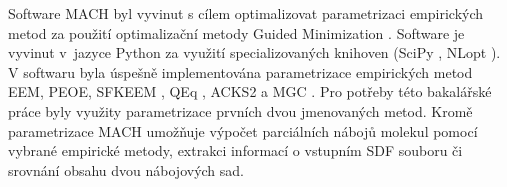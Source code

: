 Software MACH byl vyvinut s cílem optimalizovat parametrizaci empirických metod za použití optimalizační metody Guided Minimization \cite{guided_m}. Software je vyvinut v~jazyce Python za využití specializovaných knihoven (SciPy \cite{scipy}, NLopt \cite{nlopt}). V softwaru byla úspešně implementována parametrizace empirických metod EEM, PEOE, SFKEEM \cite{sfkeem}, QEq \cite{molsimul}, ACKS2 \cite{acsk2} a MGC \cite{mgc}. Pro potřeby této bakalářské práce byly využity parametrizace prvních dvou jmenovaných metod. Kromě parametrizace MACH umožňuje výpočet parciálních nábojů molekul pomocí vybrané empirické metody, extrakci informací o vstupním SDF souboru či srovnání obsahu dvou nábojových sad.
